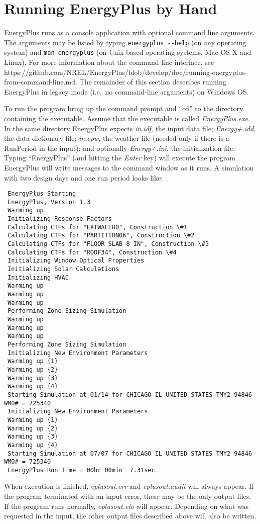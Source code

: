 \section{Running EnergyPlus by Hand}\label{running-energyplus-by-hand}

EnergyPlus runs as a console application with optional command line arguments. The arguments may be listed by typing \lstinline!energyplus --help! (on any operating system) and \lstinline!man energyplus! (on Unix-based operating systems, Mac OS X and Linux). For more information about the command line interface, see https://github.com/NREL/EnergyPlus/blob/develop/doc/running-energyplus-from-command-line.md. The remainder of this section describes running EnergyPlus in legacy mode (i.e.~no command-line arguments) on Windows OS.

To run the program bring up the command prompt and ``cd'' to the directory containing the executable. Assume that the executable is called \emph{EnergyPlus.exe}. In the same directory EnergyPlus expects \emph{in.idf}, the input data file; \emph{Energy+.idd}, the data dictionary file; \emph{in.epw}, the weather file (needed only if there is a RunPeriod in the input); and optionally \emph{Energy+.ini}, the initialization file. Typing ``EnergyPlus'' (and hitting the \emph{Enter} key) will execute the program. EnergyPlus will write messages to the command window as it runs. A simulation with two design days and one run period looks like:

\begin{lstlisting}
 EnergyPlus Starting
 EnergyPlus, Version 1.3
 Warming up
 Initializing Response Factors
 Calculating CTFs for "EXTWALL80", Construction \#1
 Calculating CTFs for "PARTITION06", Construction \#2
 Calculating CTFs for "FLOOR SLAB 8 IN", Construction \#3
 Calculating CTFs for "ROOF34", Construction \#4
 Initializing Window Optical Properties
 Initializing Solar Calculations
 Initializing HVAC
 Warming up
 Warming up
 Warming up
 Performing Zone Sizing Simulation
 Warming up
 Warming up
 Warming up
 Performing Zone Sizing Simulation
 Initializing New Environment Parameters
 Warming up {1}
 Warming up {2}
 Warming up {3}
 Warming up {4}
 Starting Simulation at 01/14 for CHICAGO IL UNITED STATES TMY2 94846 WMO# = 725340
 Initializing New Environment Parameters
 Warming up {1}
 Warming up {2}
 Warming up {3}
 Warming up {4}
 Starting Simulation at 07/07 for CHICAGO IL UNITED STATES TMY2 94846 WMO# = 725340
 EnergyPlus Run Time = 00hr 00min  7.31sec
\end{lstlisting}

When execution is finished, \emph{eplusout.err} and \emph{eplusout.audit} will always appear. If the program terminated with an input error, these may be the only output files. If the program runs normally, \emph{eplusout.eio} will appear. Depending on what was requested in the input, the other output files described above will also be written.
